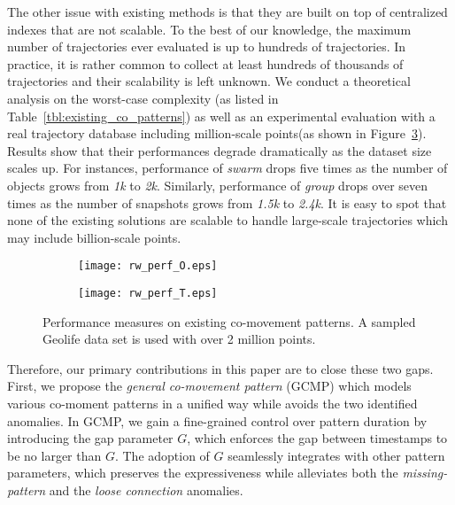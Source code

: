 The other issue with existing methods is that they are 
built on top of centralized indexes that are not scalable. 
To the best of our knowledge, the maximum number of trajectories 
ever evaluated is up to hundreds of trajectories. 
In practice, it is rather common to collect at least hundreds of thousands of trajectories 
and their scalability is left unknown. We conduct a theoretical analysis on the worst-case complexity (as listed in Table~\ref{tbl:existing_co_patterns}) as well as an experimental evaluation with a real trajectory database including million-scale points(as shown in Figure~\ref{fig:related_work_scalability}). 
Results show that their performances degrade dramatically as the dataset size scales up. For instances,
performance of \emph{swarm} drops five times as the number of objects grows from \emph{1k} to \emph{2k}. Similarly,
performance of \emph{group} drops over seven times as the number of snapshots grows from \emph{1.5k} to \emph{2.4k}.
It is easy to spot that none of the existing solutions are scalable to handle large-scale trajectories which may include billion-scale points.
\begin{figure}[h]
    \centering
    \begin{subfigure}[b]{0.23\textwidth}
            \centering
            \texttt{[image: rw\_perf\_O.eps]}
    \label{fig:fig1}
    \end{subfigure}
    \begin{subfigure}[b]{0.23\textwidth}
            \centering
            \texttt{[image: rw\_perf\_T.eps]}
    \label{fig:fig2}
    \end{subfigure}
    \caption{Performance measures on existing co-movement patterns. A sampled Geolife data set
    is used with over 2 million points.}
    \label{fig:related_work_scalability}
\end{figure}




Therefore, our primary contributions in this paper are to close these two gaps. 
First, we propose the \emph{general co-movement pattern} (GCMP) which models
various co-moment patterns in a unified way while avoids 
the two identified anomalies. In GCMP, we gain a
fine-grained control over pattern duration by introducing the gap 
parameter $G$, which enforces the gap between 
timestamps to be no larger than $G$.  
The adoption of $G$ seamlessly integrates with other pattern parameters,
which preserves the expressiveness while
alleviates both the \emph{missing-pattern} and the \emph{loose connection} anomalies.

